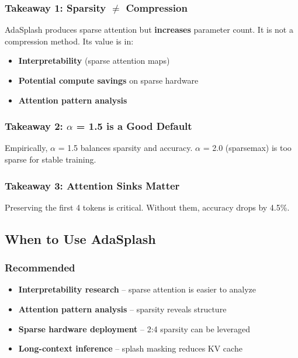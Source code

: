 \subsubsection{Takeaway 1: Sparsity $\ne$ Compression}

AdaSplash produces sparse attention but \textbf{increases} parameter count. 
It is not a compression method. Its value is in:
\begin{itemize}
\item \textbf{Interpretability} (sparse attention maps)
\item \textbf{Potential compute savings} on sparse hardware
\item \textbf{Attention pattern analysis}

\end{itemize}
\subsubsection{Takeaway 2: $\alpha$ = 1.5 is a Good Default}

Empirically, $\alpha$ = 1.5 balances sparsity and accuracy. $\alpha$ = 2.0 (sparsemax) 
is too sparse for stable training.

\subsubsection{Takeaway 3: Attention Sinks Matter}

Preserving the first 4 tokens is critical. Without them, accuracy drops by 
4.5\%.

\subsection{When to Use AdaSplash}

\subsubsection{Recommended}

\begin{itemize}
\item \textbf{Interpretability research} -- sparse attention is easier to analyze
\item \textbf{Attention pattern analysis} -- sparsity reveals structure
\item \textbf{Sparse hardware deployment} -- 2:4 sparsity can be leveraged
\item \textbf{Long-context inference} -- splash masking reduces KV cache

\end{itemize}
